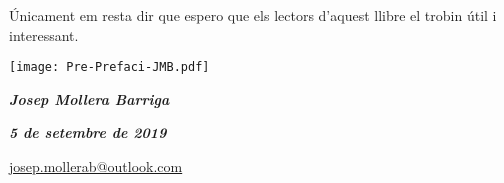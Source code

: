    Únicament em resta dir que espero que els lectors d'aquest llibre el trobin
   útil i interessant.

\vspace*{0.5cm}
\hfill
\begin{minipage}[b]{35mm}
    \texttt{[image: Pre-Prefaci-JMB.pdf]}
\end{minipage}

{\large

    \hfill \textbf{\textsl{Josep Mollera Barriga}}

    \hfill \textbf{\textsl{5 de setembre de 2019}}

    \hfill {\small \href{mailto:josep.mollerab@outlook.com}{\faEnvelope\hspace{2mm}josep.mollerab@outlook.com} }

}

